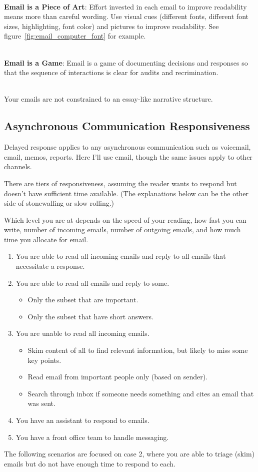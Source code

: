 \ \\
\textbf{Email is a Piece of Art}: Effort invested in each email to improve readability means more than careful wording. 
Use visual cues (different fonts, different font sizes, highlighting, font color) and pictures to improve readability. See figure~\ref{fig:email_computer_font} for example.

\ \\
\textbf{Email is a Game}: Email is a game of documenting decisions and responses so that the sequence of interactions is clear for audits and recrimination. 

\ \\
Your emails are not constrained to an essay-like narrative structure. 

\subsection*{Asynchronous Communication Responsiveness\label{sec:email-responsiveness}}

Delayed response applies to any asynchronous communication such as voicemail, email, memos, reports. Here I'll use email, though the same issues apply to other channels.


There are tiers of responsiveness, assuming the reader wants to respond but doesn't have sufficient time available.
(The explanations below can be the other side of \gls{stonewalling} or \gls{slow rolling}.)

Which level you are at depends on the speed of your reading, how fast you can write, number of incoming emails, number of outgoing emails, and how much time you allocate for email. 
\begin{enumerate}
    \item You are able to read all incoming emails and reply to all emails that necessitate a response.
    \item You are able to read all emails and reply to some. 
    \begin{itemize}
        \item Only the subset that are important.
        \item Only the subset that have short answers.
    \end{itemize}
    \item You are unable to read all incoming emails. 
    \begin{itemize}
        \item Skim content of all to find relevant information, but likely to miss some key points.
        \item Read email from important people only (based on sender).
        \item Search through inbox if someone needs something and cites an email that was sent.
    \end{itemize}
    \item You have an assistant to respond to emails.
    \item You have a front office team to handle messaging.
\end{enumerate}
The following scenarios are focused on case 2, where you are able to triage (skim) emails but do not have enough time to respond to each.



